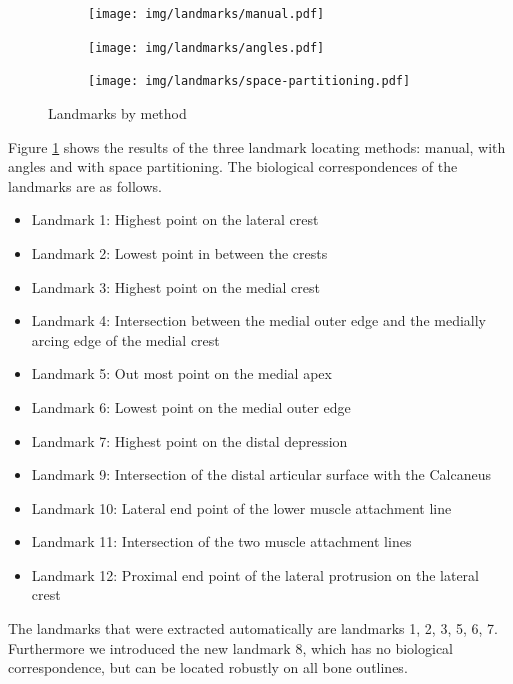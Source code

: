 \documentclass[pdftex,12pt,a4paper]{report}
\begin{document}
\begin{figure}[h]
	\centering
	\begin{subfigure}[b]{0.3\textwidth}
		\centering
		\texttt{[image: img/landmarks/manual.pdf]}
	\end{subfigure}
	\begin{subfigure}[b]{0.3\textwidth}
		\centering
		\texttt{[image: img/landmarks/angles.pdf]}
	\end{subfigure}
	\begin{subfigure}[b]{0.3\textwidth}
		\centering
		\texttt{[image: img/landmarks/space-partitioning.pdf]}
	\end{subfigure}
	\caption{Landmarks by method}
	\label{fig:landmark-methods}
\end{figure}

Figure \ref{fig:landmark-methods} shows the results of the three landmark locating methods: manual, with angles and
with space partitioning. The biological correspondences of the landmarks are as follows.

\begin{itemize}
\item Landmark 1: Highest point on the lateral crest
\item Landmark 2: Lowest point in between the crests
\item Landmark 3: Highest point on the medial crest
\item Landmark 4: Intersection between the medial outer edge and the medially arcing edge of the medial crest
\item Landmark 5: Out most point on the medial apex
\item Landmark 6: Lowest point on the medial outer edge
\item Landmark 7: Highest point on the distal depression
\item Landmark 9: Intersection of the distal articular surface with the Calcaneus
\item Landmark 10: Lateral end point of the lower muscle attachment line
\item Landmark 11: Intersection of the two muscle attachment lines
\item Landmark 12: Proximal end point of the lateral protrusion on the lateral crest
\end{itemize}

The landmarks that were extracted automatically are landmarks 1, 2, 3, 5, 6, 7. Furthermore we introduced the new
landmark 8, which has no biological correspondence, but can be located robustly on all bone outlines.
\end{document}
